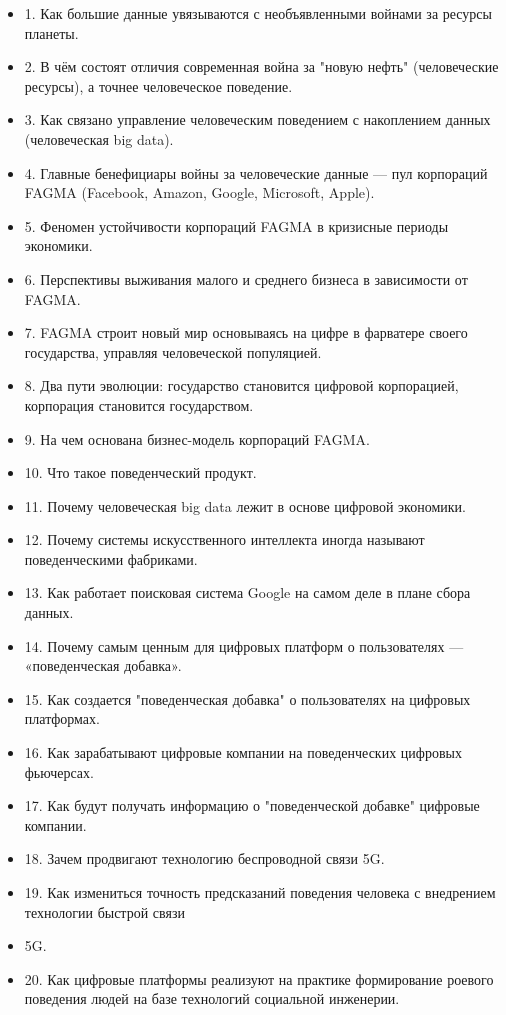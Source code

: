 \begin{itemize}
\item 1. Как большие данные увязываются с необъявленными войнами за ресурсы планеты.
\item 2. В чём состоят отличия современная война за "новую нефть" (человеческие ресурсы), а точнее человеческое поведение.
\item 3. Как связано управление человеческим поведением с накоплением данных (человеческая big data).
\item 4. Главные бенефициары войны за человеческие данные --- пул корпораций FAGMA (Facebook, Amazon, Google, Microsoft, Apple).
\item 5. Феномен устойчивости корпораций FAGMA в кризисные периоды экономики.
\item 6. Перспективы выживания малого и среднего бизнеса в зависимости от FAGMA.
\item 7. FAGMA строит новый мир основываясь на цифре в фарватере своего государства, управляя человеческой популяцией.
\item 8. Два пути эволюции: государство становится цифровой корпорацией, корпорация становится государством.
\item 9. На чем основана бизнес-модель корпораций FAGMA.
\item 10. Что такое поведенческий продукт.
\item 11. Почему человеческая big data лежит в основе цифровой экономики.
\item 12. Почему системы искусственного интеллекта иногда называют поведенческими фабриками.
\item 13. Как работает поисковая система Google на самом деле в плане сбора данных.
\item 14. Почему самым ценным для цифровых платформ о пользователях --- «поведенческая добавка».
\item 15. Как создается "поведенческая добавка" о пользователях на цифровых платформах.
\item 16. Как зарабатывают цифровые компании на поведенческих цифровых фьючерсах.
\item 17. Как будут получать информацию о "поведенческой добавке" цифровые компании.
\item 18. Зачем продвигают технологию беспроводной связи 5G.
\item 19. Как измениться точность предсказаний поведения человека с внедрением технологии быстрой связи \item 5G.
\item 20. Как цифровые платформы реализуют на практике формирование роевого поведения людей на базе технологий социальной инженерии.

\end{itemize}
